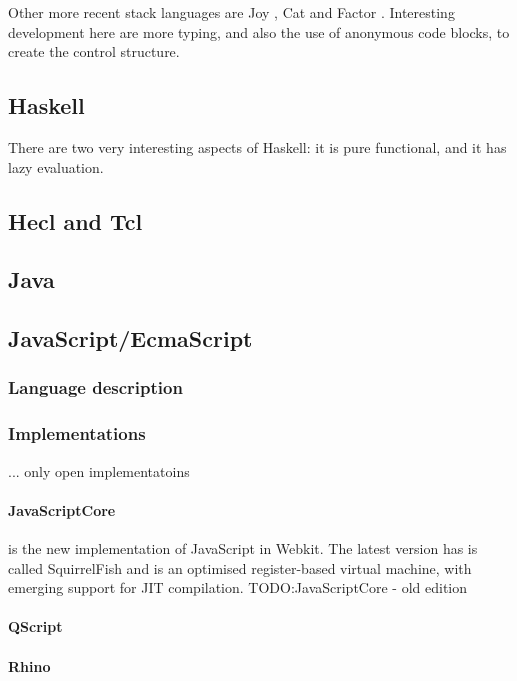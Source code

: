 \documentclass[11pt]{report}
\begin{document}
Other more recent stack languages are Joy \cite{joy-language}, Cat \cite{cat-language} and Factor \cite{factor-language}.
Interesting development here are more typing, and also the use of anonymous code blocks, 
to create the control structure.


\subsection{Haskell}
There are two very interesting aspects of Haskell: it is pure functional, and it has lazy evaluation.

\subsection{Hecl and Tcl}

\subsection{Java}

\subsection{JavaScript/EcmaScript}
\label{JavaScript}
\subsubsection{Language description}
\subsubsection{Implementations}
... only open implementatoins

\paragraph{JavaScriptCore} is the new implementation of JavaScript in Webkit.
The latest version has is called SquirrelFish and is an optimised register-based virtual machine,
with emerging support for JIT compilation.
TODO:JavaScriptCore - old edition

\paragraph{QScript}

\paragraph{Rhino}
\end{document}
